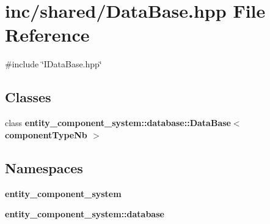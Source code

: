 \section{inc/shared/\+Data\+Base.hpp File Reference}
\label{_data_base_8hpp}
{\ttfamily \#include \char`\"{}I\+Data\+Base.\+hpp\char`\"{}}\newline
\subsection*{Classes}
\begin{DoxyCompactItemize}
\item 
class {\bf entity\+\_\+component\+\_\+system\+::database\+::\+Data\+Base$<$ component\+Type\+Nb $>$}
\end{DoxyCompactItemize}
\subsection*{Namespaces}
\begin{DoxyCompactItemize}
\item 
 {\bf entity\+\_\+component\+\_\+system}
\item 
 {\bf entity\+\_\+component\+\_\+system\+::database}
\end{DoxyCompactItemize}
